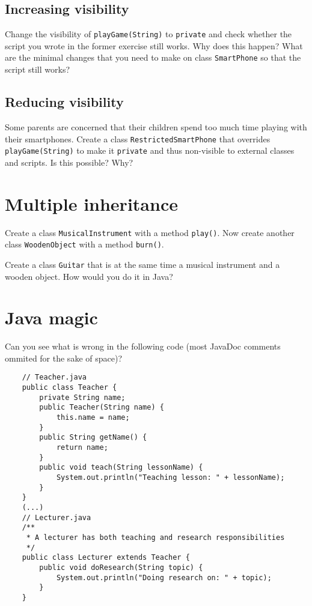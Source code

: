 \documentclass{article}
\begin{document}
\subsection{Increasing visibility}
\label{sec:incr-visib}

Change the visibility of \verb+playGame(String)+ to
\verb+private+ and check whether the script you wrote in the former
exercise still works. Why does this happen? What are the minimal
changes that you need to make on
class \verb+SmartPhone+ so that the script still works? 

%

\subsection{Reducing visibility}
\label{sec:reducing-visibility}

Some parents are concerned that their children spend too much time
playing with their smartphones. Create a class
\verb+RestrictedSmartPhone+ that overrides \verb+playGame(String)+ to
make it \verb+private+ and thus non-visible to external classes and
scripts. Is this possible? Why?

\section{Multiple inheritance}
\label{sec:multiple-inheritance}

Create a class \verb+MusicalInstrument+ with a method
\verb+play()+. Now create another class \verb+WoodenObject+ with a
method \verb+burn()+.

Create a class \verb+Guitar+ that is at the same time a musical
instrument and a wooden object. How would you do it in Java?

\section{Java magic}
\label{sec:java-magic}

Can you see what is wrong in the following code (most JavaDoc comments
ommited for the sake of space)? 

\begin{verbatim}
    // Teacher.java
    public class Teacher {
        private String name; 
        public Teacher(String name) {
            this.name = name;
        }
        public String getName() {
            return name;
        }
        public void teach(String lessonName) {
            System.out.println("Teaching lesson: " + lessonName);
        }
    }
    (...) 
    // Lecturer.java
    /**
     * A lecturer has both teaching and research responsibilities
     */
    public class Lecturer extends Teacher {
        public void doResearch(String topic) {
            System.out.println("Doing research on: " + topic);
        }
    }
\end{verbatim}
\end{document}
